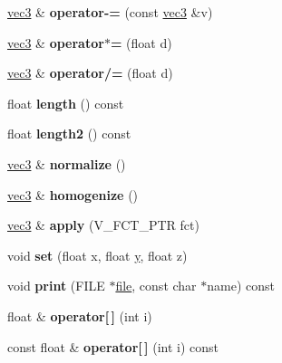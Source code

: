 \begin{DoxyCompactItemize}
\item 
\hypertarget{classvec3_a53beb9bf7c29bd960067f1980af16616}{\hyperlink{classvec3}{vec3} \& {\bfseries operator-\/=} (const \hyperlink{classvec3}{vec3} \&v)}\label{classvec3_a53beb9bf7c29bd960067f1980af16616}

\item 
\hypertarget{classvec3_a31f1b0795dd08111e097f458b1298fc4}{\hyperlink{classvec3}{vec3} \& {\bfseries operator$\ast$=} (float d)}\label{classvec3_a31f1b0795dd08111e097f458b1298fc4}

\item 
\hypertarget{classvec3_ac61caa794b99be2629a8508bd17aa976}{\hyperlink{classvec3}{vec3} \& {\bfseries operator/=} (float d)}\label{classvec3_ac61caa794b99be2629a8508bd17aa976}

\item 
\hypertarget{classvec3_ad622150f0a08c548b062775dd5d76a41}{float {\bfseries length} () const }\label{classvec3_ad622150f0a08c548b062775dd5d76a41}

\item 
\hypertarget{classvec3_ae5974e67294836736f5123aff4e101ca}{float {\bfseries length2} () const }\label{classvec3_ae5974e67294836736f5123aff4e101ca}

\item 
\hypertarget{classvec3_a60a812fe6ca372c1d3f73cf303616760}{\hyperlink{classvec3}{vec3} \& {\bfseries normalize} ()}\label{classvec3_a60a812fe6ca372c1d3f73cf303616760}

\item 
\hypertarget{classvec3_ab61ef49bbf503f5036305e8e93c87b3b}{\hyperlink{classvec3}{vec3} \& {\bfseries homogenize} ()}\label{classvec3_ab61ef49bbf503f5036305e8e93c87b3b}

\item 
\hypertarget{classvec3_a4ebbd3e3e9bbbc518182a59d4421008b}{\hyperlink{classvec3}{vec3} \& {\bfseries apply} (V\+\_\+\+F\+C\+T\+\_\+\+P\+T\+R fct)}\label{classvec3_a4ebbd3e3e9bbbc518182a59d4421008b}

\item 
\hypertarget{classvec3_adc914c651687e311dd96aad8eec953c6}{void {\bfseries set} (float x, float \hyperlink{_ice_utils_8h_aa7ffaed69623192258fb8679569ff9ba}{y}, float z)}\label{classvec3_adc914c651687e311dd96aad8eec953c6}

\item 
\hypertarget{classvec3_ae6d60a16e6d86732226c665ab22b1a84}{void {\bfseries print} (F\+I\+L\+E $\ast$\hyperlink{structfile}{file}, const char $\ast$name) const }\label{classvec3_ae6d60a16e6d86732226c665ab22b1a84}

\item 
\hypertarget{classvec3_a09b581955363f59d035a5aeb6b037f06}{float \& {\bfseries operator\mbox{[}$\,$\mbox{]}} (int i)}\label{classvec3_a09b581955363f59d035a5aeb6b037f06}

\item 
\hypertarget{classvec3_a25f1ca4c215d7d5f4d1778d72c65517c}{const float \& {\bfseries operator\mbox{[}$\,$\mbox{]}} (int i) const }\label{classvec3_a25f1ca4c215d7d5f4d1778d72c65517c}

\end{DoxyCompactItemize}
